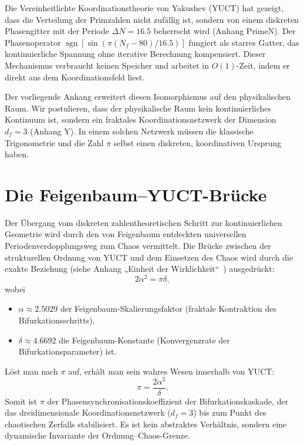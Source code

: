 \documentclass[12pt,a4paper]{article}
\newcommand{\df}{d_{\!f}}
\begin{document}
	Die Vereinheitlichte Koordinationstheorie von Yakushev (YUCT) hat gezeigt, dass die Verteilung der Primzahlen nicht zufällig ist, sondern von einem diskreten Phasengitter mit der Periode $\Delta N = 16.5$ beherrscht wird (Anhang PrimeN). Der Phasenoperator $\operatorname{sgn}[\sin(\pi(N_f-80)/16.5)]$ fungiert als starres Gatter, das kontinuierliche Spannung ohne iterative Berechnung kompensiert. Dieser Mechanismus verbraucht keinen Speicher und arbeitet in $O(1)$-Zeit, indem er direkt aus dem Koordinationsfeld liest.
	
	Der vorliegende Anhang erweitert diesen Isomorphismus auf den physikalischen Raum. Wir postulieren, dass der physikalische Raum kein kontinuierliches Kontinuum ist, sondern ein fraktales Koordinationsnetzwerk der Dimension $\df=3$ (Anhang Y). In einem solchen Netzwerk müssen die klassische Trigonometrie und die Zahl $\pi$ selbst einen diskreten, koordinativen Ursprung haben.
	
	\section{Die Feigenbaum–YUCT-Brücke}
	\label{sec:bridge}
	
	Der Übergang vom diskreten zahlentheoretischen Schritt zur kontinuierlichen Geometrie wird durch den von Feigenbaum entdeckten universellen Periodenverdopplungsweg zum Chaos vermittelt. Die Brücke zwischen der strukturellen Ordnung von YUCT und dem Einsetzen des Chaos wird durch die exakte Beziehung (siehe Anhang „Einheit der Wirklichkeit“~\cite{UnityReality}) ausgedrückt:
	\begin{equation}
		2\alpha^2 = \pi\delta,
		\label{eq:bridge}
	\end{equation}
	wobei
	\begin{itemize}
		\item $\alpha \approx 2.5029$ der Feigenbaum-Skalierungsfaktor (fraktale Kontraktion des Bifurkationsschritts),
		\item $\delta \approx 4.6692$ die Feigenbaum-Konstante (Konvergenzrate der Bifurkationsparameter) ist.
	\end{itemize}
	Löst man nach $\pi$ auf, erhält man sein wahres Wesen innerhalb von YUCT:
	\begin{equation}
		\boxed{\pi = \frac{2\alpha^2}{\delta}}.
		\label{eq:pi-from-feigenbaum}
	\end{equation}
	Somit ist $\pi$ der Phasensynchronisationskoeffizient der Bifurkationskaskade, der das dreidimensionale Koordinationsnetzwerk ($\df=3$) bis zum Punkt des chaotischen Zerfalls stabilisiert. Es ist kein abstraktes Verhältnis, sondern eine dynamische Invariante der Ordnung–Chaos-Grenze.
	
\end{document}
